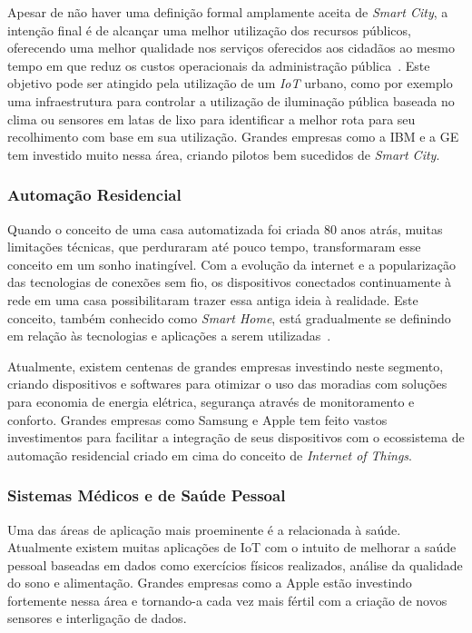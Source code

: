 Apesar de não haver uma definição formal amplamente aceita de \textit{Smart City}, a intenção final é de
alcançar uma melhor utilização dos recursos públicos, oferecendo uma melhor qualidade nos serviços oferecidos
aos cidadãos ao mesmo tempo em que reduz os custos operacionais da administração pública~\cite{IoTSmart2014}.
Este objetivo pode ser atingido pela utilização de um \textit{IoT} urbano, como por exemplo uma infraestrutura
para controlar a utilização de iluminação pública baseada no clima ou sensores em latas de lixo para
identificar a melhor rota para seu recolhimento com base em sua utilização. Grandes empresas como a
IBM e a GE tem investido muito nessa área, criando pilotos bem sucedidos de \textit{Smart City}.

\subsubsection{Automação Residencial}
Quando o conceito de uma casa automatizada foi criada 80 anos atrás, muitas limitações técnicas, que perduraram
até pouco tempo, transformaram esse conceito em um sonho inatingível. Com a evolução da internet e a popularização
das tecnologias de conexões sem fio, os dispositivos conectados continuamente à rede em uma casa possibilitaram
trazer essa antiga ideia à realidade. Este conceito, também conhecido como \textit{Smart Home}, está gradualmente
se definindo em relação às tecnologias e aplicações a serem utilizadas~\cite{6418824}.

Atualmente, existem centenas de grandes empresas investindo neste segmento, criando dispositivos e softwares
para otimizar o uso das moradias com soluções para economia de energia elétrica, segurança
através de monitoramento e conforto. Grandes empresas como Samsung e Apple tem feito vastos investimentos
para facilitar a integração de seus dispositivos com o ecossistema de automação residencial criado em cima
do conceito de \textit{Internet of Things}.

\subsubsection{Sistemas Médicos e de Saúde Pessoal}
Uma das áreas de aplicação mais proeminente é a relacionada à saúde. Atualmente existem muitas aplicações
de IoT com o intuito de melhorar a saúde pessoal baseadas em dados como exercícios físicos realizados,
análise da qualidade do sono e alimentação. Grandes empresas como a Apple estão investindo fortemente nessa
área e tornando-a cada vez mais fértil com a criação de novos sensores e interligação de dados.

